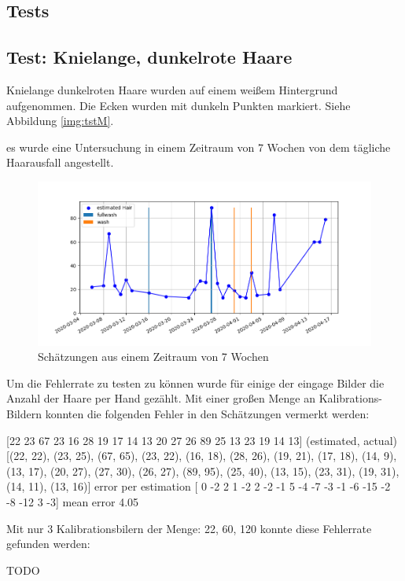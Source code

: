 \documentclass[german,a4paper, 12pt]{scrartcl}
\begin{document}
\subsection{Tests}
\subsection{Test: Knielange, dunkelrote Haare}

Knielange dunkelroten Haare wurden auf einem weißem Hintergrund aufgenommen. Die Ecken wurden mit dunkeln Punkten markiert. Siehe Abbildung \ref{img:tstM}.





es wurde eine Untersuchung in einem Zeitraum von 7 Wochen von dem tägliche Haarausfall angestellt. 
\begin{figure}
	\centering
	\includegraphics[width=1.0\textwidth]{fig64/plot.png}
	\caption[]{Schätzungen aus einem Zeitraum von 7 Wochen}
	\label{img:guess}
\end{figure} 

Um die Fehlerrate zu testen zu können wurde für einige der eingage Bilder die Anzahl der Haare per Hand gezählt.
Mit einer großen Menge an Kalibrations-Bildern konnten die folgenden Fehler in den Schätzungen vermerkt werden:
 
[22 23 67 23 16 28 19 17 14 13 20 27 26 89 25 13 23 19 14 13]
(estimated, actual)
[(22, 22), (23, 25), (67, 65), (23, 22), (16, 18), (28, 26), (19, 21), (17, 18), (14, 9), (13, 17), (20, 27), (27, 30), (26, 27), (89, 95), (25, 40), (13, 15), (23, 31), (19, 31), (14, 11), (13, 16)]
error per estimation [  0  -2   2   1  -2   2  -2  -1   5  -4  -7  -3  -1  -6 -15  -2  -8 -12 3  -3]
mean error 4.05

Mit nur 3 Kalibrationsbilern der Menge: 22, 60, 120 konnte diese Fehlerrate gefunden werden:

TODO
\end{document}
